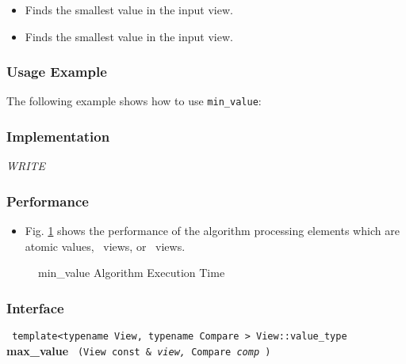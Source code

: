 \begin{itemize}
\item
Finds the smallest value in the input view. 
\item
Finds the smallest value in the input view. 
\end{itemize}

\subsubsection{Usage Example} %

The following example shows how to use \texttt{min\_value}:

 
\subsubsection{Implementation} %

\textit{WRITE}

\subsubsection{Performance} %

\begin{itemize}
\item
Fig. \ref{fig:minval-alg-exec-exper}
shows the performance of the algorithm processing
elements which are atomic values, \stl\ views, or \stapl\ views.
\end{itemize}

\begin{figure}[p]
\caption{min\_value Algorithm Execution Time}
\label{fig:minval-alg-exec-exper}
\end{figure}

 
\subsubsection{Interface} %

\noindent
\texttt{%
template<typename View, typename Compare >
\newline
View::value\_type 
}
\newline
\textbf{max\_value}%
\texttt{%
(View const \&
\textit{view,}%
Compare 
\textit{comp}%
)
}
\vspace{0.4cm}

